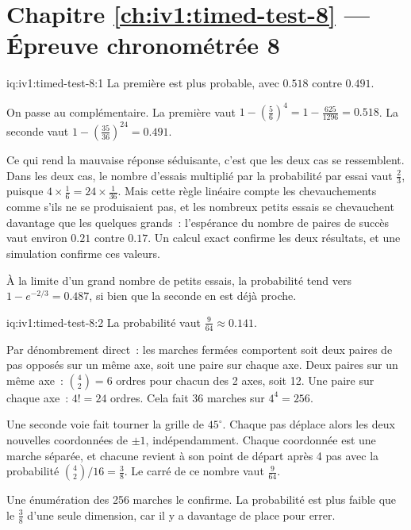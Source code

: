 \section*{Chapitre \ref{ch:iv1:timed-test-8} --- Épreuve chronométrée 8}

\begin{solution}{iq:iv1:timed-test-8:1}
La première est plus probable, avec $0.518$ contre $0.491$.

On passe au complémentaire. La première vaut $1 - (\frac56)^4 = 1 - \frac{625}{1296} = 0.518$. La seconde vaut $1 - (\frac{35}{36})^{24} = 0.491$.

Ce qui rend la mauvaise réponse séduisante, c'est que les deux cas se ressemblent. Dans les deux cas, le nombre d'essais multiplié par la probabilité par essai vaut $\frac23$, puisque $4 \times \frac16 = 24 \times \frac{1}{36}$. Mais cette règle linéaire compte les chevauchements comme s'ils ne se produisaient pas, et les nombreux petits essais se chevauchent davantage que les quelques grands~: l'espérance du nombre de paires de succès vaut environ $0.21$ contre $0.17$. Un calcul exact confirme les deux résultats, et une simulation confirme ces valeurs.

À la limite d'un grand nombre de petits essais, la probabilité tend vers $1 - e^{-2/3} = 0.487$, si bien que la seconde en est déjà proche.

\end{solution}

\begin{solution}{iq:iv1:timed-test-8:2}
La probabilité vaut $\frac{9}{64} \approx 0.141$.

Par dénombrement direct~: les marches fermées comportent soit deux paires de pas opposés sur un même axe, soit une paire sur chaque axe. Deux paires sur un même axe~: $\binom42 = 6$ ordres pour chacun des 2 axes, soit 12. Une paire sur chaque axe~: $4! = 24$ ordres. Cela fait 36 marches sur $4^4 = 256$.

Une seconde voie fait tourner la grille de $45^\circ$. Chaque pas déplace alors les deux nouvelles coordonnées de $\pm1$, indépendamment. Chaque coordonnée est une marche séparée, et chacune revient à son point de départ après 4 pas avec la probabilité $\binom42/16 = \frac38$. Le carré de ce nombre vaut $\frac{9}{64}$.

Une énumération des 256 marches le confirme. La probabilité est plus faible que le $\frac38$ d'une seule dimension, car il y a davantage de place pour errer.

\end{solution}

